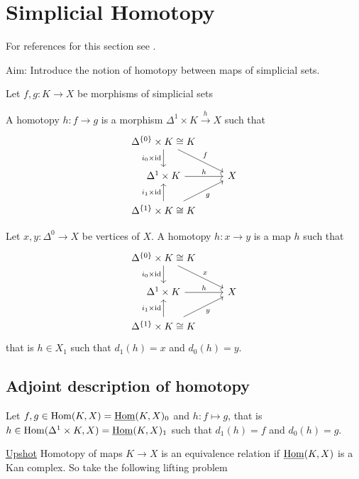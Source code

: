 \section{Simplicial Homotopy}

For references for this section see \cite[Section I.7]{GoerSimp1999}.

Aim: Introduce the notion of homotopy between maps of simplicial sets.

\begin{defi}
    Let $f,g \colon K \to X$ be morphisms of simplicial sets
\end{defi}

A homotopy $h\colon f \to g$ is a morphism $\Delta^1 \times K \xrightarrow{h} X$ such that 
\[
\begin{tikzcd}
    \Delta^{\{0\}} \times K \cong K
    \ar[d, "i_0 \times \id"']
    \ar[dr, "f"]
    \\
    \Delta^1 \times K 
    \ar[r,"h"]
    &
    X
    \\
    \Delta^{\{1\}}\times K \cong K
    \ar[u,"i_1 \times \id"]
    \ar[ur, "g"']
\end{tikzcd}
\]

\begin{exmp}
    Let $x,y \colon \Delta^0 \to X$ be vertices of $X$. 
    A homotopy $h\colon x \to y$ is a map $h$ such that
    \[
    \begin{tikzcd}
        \Delta^{\{0\}} \times K \cong K
        \ar[d, "i_0 \times \id"']
        \ar[dr, "x"]
        \\
        \Delta^1 \times K 
        \ar[r,"h"]
        &
        X
        \\
        \Delta^{\{1\}}\times K \cong K
        \ar[u,"i_1 \times \id"]
        \ar[ur, "y"']
    \end{tikzcd}
    \]
    that is $h \in X_1$ such that $d_1(h)=x$ and $d_0(h)=y$.
\end{exmp}

\subsection{Adjoint description of homotopy}
Let $f,g \in \operatorname{Hom}(K,X) = \underline{\operatorname{Hom}}(K,X)_0$ and $h\colon f\mapsto g$, that is $h \in \operatorname{Hom}(\Delta^1 \times K, X) = \underline{\operatorname{Hom}}(K,X)_1$ such that $d_1(h)=f$ and $d_0(h)=g$.

\underline{Upshot} Homotopy of maps $K \to X$ is an equivalence relation if $\underline{\operatorname{Hom}}(K,X)$ is a Kan complex.
So take the following lifting problem

